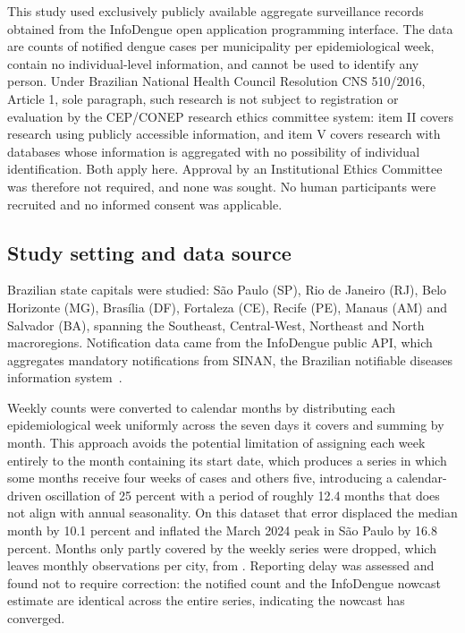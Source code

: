 \documentclass[10pt,letterpaper]{article}
\begin{document}
This study used exclusively publicly available aggregate surveillance records obtained from the InfoDengue open application programming interface. The data are counts of notified dengue cases per municipality per epidemiological week, contain no individual-level information, and cannot be used to identify any person. Under Brazilian National Health Council Resolution CNS 510/2016, Article 1, sole paragraph, such research is not subject to registration or evaluation by the CEP/CONEP research ethics committee system: item II covers research using publicly accessible information, and item V covers research with databases whose information is aggregated with no possibility of individual identification. Both apply here. Approval by an Institutional Ethics Committee was therefore not required, and none was sought. No human participants were recruited and no informed consent was applicable.

\subsection*{Study setting and data source}

 Brazilian state capitals were studied: S\~ao Paulo (SP), Rio de Janeiro (RJ), Belo Horizonte (MG), Bras\'ilia (DF), Fortaleza (CE), Recife (PE), Manaus (AM) and Salvador (BA), spanning the Southeast, Central-West, Northeast and North macroregions. Notification data came from the InfoDengue public API, which aggregates mandatory notifications from SINAN, the Brazilian notifiable diseases information system~\cite{Codeco2018infodengue}.

Weekly counts were converted to calendar months by distributing each epidemiological week uniformly across the seven days it covers and summing by month. This approach avoids the potential limitation of assigning each week entirely to the month containing its start date, which produces a series in which some months receive four weeks of cases and others five, introducing a calendar-driven oscillation of 25 percent with a period of roughly 12.4 months that does not align with annual seasonality. On this dataset that error displaced the median month by 10.1 percent and inflated the March 2024 peak in S\~ao Paulo by 16.8 percent. Months only partly covered by the weekly series were dropped, which leaves  monthly observations per city, from . Reporting delay was assessed and found not to require correction: the notified count and the InfoDengue nowcast estimate are identical across the entire series, indicating the nowcast has converged.
\end{document}
